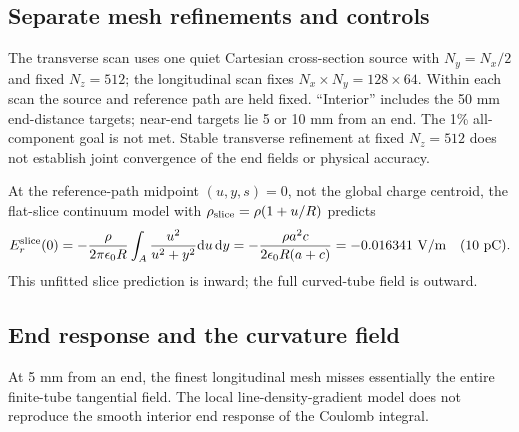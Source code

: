 
\clearpage
\subsection{Separate mesh refinements and controls}
The transverse scan uses one quiet Cartesian cross-section source with
$N_y=N_x/2$ and fixed $N_z=512$; the longitudinal scan fixes
$N_x\times N_y=128\times64$.
Within each scan the source and reference path are held fixed.
``Interior'' includes the 50 mm end-distance targets; near-end targets lie
5 or 10 mm from an end. The 1\% all-component goal is not met. Stable
transverse refinement at fixed $N_z=512$ does not establish joint convergence
of the end fields or physical accuracy.



At the reference-path midpoint $(u,y,s)=0$, not the global charge centroid,
the flat-slice continuum model with $\rho_{\rm slice}=\rho(1+u/R)$ predicts
\begin{equation}
 E_r^{\rm slice}(0)=-\frac{\rho}{2\pi\epsilon_0 R}
 \int_A\frac{u^2}{u^2+y^2}\mathrm d u\,\mathrm d y
 =-\frac{\rho a^2c}{2\epsilon_0 R(a+c)}
 =-0.016341\ {\rm V/m}\quad(10\ {\rm pC}).
 \label{eq:frozen-flat-slice}
\end{equation}
This unfitted slice prediction is inward; the full curved-tube field is outward.

\clearpage
\subsection{End response and the curvature field}
At 5 mm from an end, the finest longitudinal mesh misses essentially the
entire finite-tube tangential field. The local line-density-gradient model
does not reproduce the smooth interior end response of the Coulomb integral.

